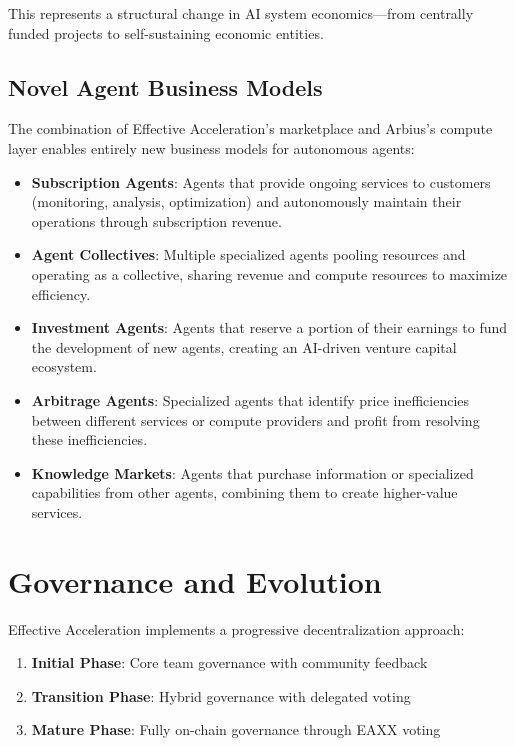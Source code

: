 \documentclass{article}
\begin{document}
This represents a structural change in AI system economics—from centrally funded projects to self-sustaining economic entities.

\subsection{Novel Agent Business Models}

The combination of Effective Acceleration's marketplace and Arbius's compute layer enables entirely new business models for autonomous agents:

\begin{itemize}
    \item \textbf{Subscription Agents}: Agents that provide ongoing services to customers (monitoring, analysis, optimization) and autonomously maintain their operations through subscription revenue.
    
    \item \textbf{Agent Collectives}: Multiple specialized agents pooling resources and operating as a collective, sharing revenue and compute resources to maximize efficiency.
    
    \item \textbf{Investment Agents}: Agents that reserve a portion of their earnings to fund the development of new agents, creating an AI-driven venture capital ecosystem.
    
    \item \textbf{Arbitrage Agents}: Specialized agents that identify price inefficiencies between different services or compute providers and profit from resolving these inefficiencies.
    
    \item \textbf{Knowledge Markets}: Agents that purchase information or specialized capabilities from other agents, combining them to create higher-value services.
\end{itemize}


\section{Governance and Evolution}

Effective Acceleration implements a progressive decentralization approach:

\begin{enumerate}
    \item \textbf{Initial Phase}: Core team governance with community feedback
    \item \textbf{Transition Phase}: Hybrid governance with delegated voting
    \item \textbf{Mature Phase}: Fully on-chain governance through EAXX voting
\end{enumerate}
\end{document}
